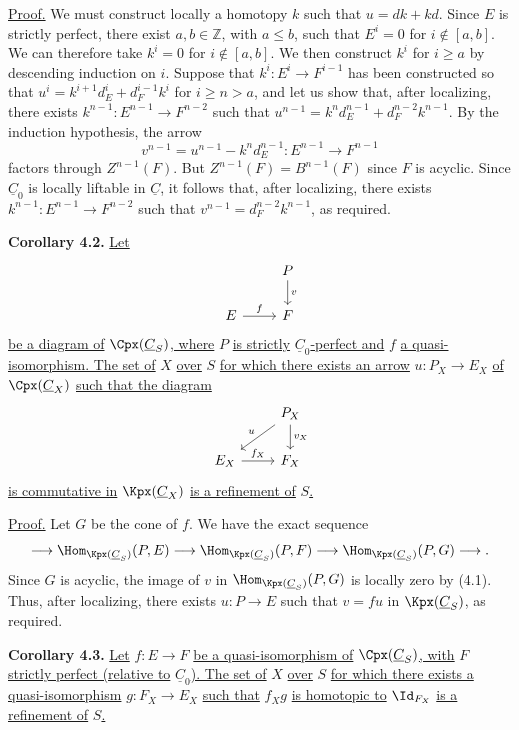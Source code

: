 \uline{Proof.} We must construct locally a homotopy \(k\) such that \(u=dk+kd\). Since \(E\) is strictly perfect, there exist \(a,b\in\mathbb Z\), with \(a\leq b\), such that \(E^i=0\) for \(i\notin[a,b]\). We can therefore take \(k^i=0\) for \(i\notin[a,b]\). We then construct \(k^i\) for \(i\geq a\) by descending induction on \(i\). Suppose that \(k^i:E^i\to F^{i-1}\) has been constructed so that \(u^i=k^{i+1}d_E^i+d_F^{i-1}k^i\) for \(i\geq n>a\), and let us show that, after localizing, there exists \(k^{n-1}:E^{n-1}\to F^{n-2}\) such that \(u^{n-1}=k^nd_E^{n-1}+d_F^{n-2}k^{n-1}\). By the induction hypothesis, the arrow
\[
  v^{n-1}=u^{n-1}-k^nd_E^{n-1}:E^{n-1}\to F^{n-1}
\]
factors through \(Z^{n-1}(F)\). But \(Z^{n-1}(F)=B^{n-1}(F)\) since \(F\) is acyclic. Since \(\underline{C}_0\) is locally liftable in \(\underline{C}\), it follows that, after localizing, there exists \(k^{n-1}:E^{n-1}\to F^{n-2}\) such that \(v^{n-1}=d_F^{n-2}k^{n-1}\), as required.

\textbf{Corollary 4.2.} \uline{Let}
\[
\begin{tikzcd}
& P \arrow[d,"v"] \\
E \arrow[r,"f"] & F
\end{tikzcd}
\]
%
\uline{be a diagram of} \(\Cpx(\underline{C}_S)\)\uline{, where} \(P\) \uline{is strictly} \(\underline{C}_0\)\uline{-perfect and} \(f\) \uline{a quasi-isomorphism. The set of} \(X\) \uline{over} \(S\) \uline{for which there exists an arrow} \(u:P_X\to E_X\) \uline{of} \(\Cpx(\underline{C}_X)\) \uline{such that the diagram}
\[
\begin{tikzcd}
& P_X \arrow[d,"v_X"] \arrow[dl,"u"']\\
E_X \arrow[r,"f_X"] & F_X
\end{tikzcd}
\]
\uline{is commutative in} \(\Kpx(\underline{C}_X)\) \uline{is a refinement of} \(S\)\uline{.}

\uline{Proof.} Let \(G\) be the cone of \(f\). We have the exact sequence
\[
  \longrightarrow \Hom_{\Kpx(\underline{C}_S)}(P,E)
  \longrightarrow \Hom_{\Kpx(\underline{C}_S)}(P,F)
  \longrightarrow \Hom_{\Kpx(\underline{C}_S)}(P,G)
  \longrightarrow .
\]
Since \(G\) is acyclic, the image of \(v\) in \(\Hom_{\Kpx(\underline{C}_S)}(P,G)\) is locally zero by (4.1). Thus, after localizing, there exists \(u:P\to E\) such that \(v=fu\) in \(\Kpx(\underline{C}_S)\), as required.

\textbf{Corollary 4.3.} \uline{Let} \(f:E\to F\) \uline{be a quasi-isomorphism of} \(\Cpx(\underline{C}_S)\)\uline{, with} \(F\) \uline{strictly perfect (relative to} \(\underline{C}_0\)\uline{). The set of} \(X\) \uline{over} \(S\) \uline{for which there exists a quasi-isomorphism} \(g:F_X\to E_X\) \uline{such that} \(f_Xg\) \uline{is homotopic to} \(\Id_{F_X}\) \uline{is a refinement of} \(S\)\uline{.}

